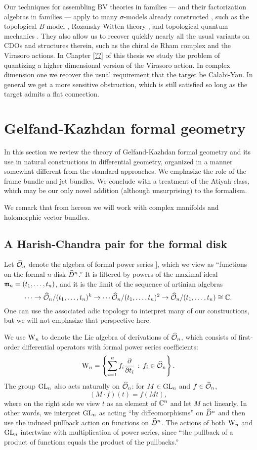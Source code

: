 \documentclass[10pt]{amsart}
\begin{document}
Our techniques for assembling BV theories in families --- and their factorization algebras in families --- apply to many $\sigma$-models already constructed , such as the topological $B$-model \cite{LiLi}, Rozansky-Witten theory \cite{CLL}, and topological quantum mechanics \cite{GG1, GLL}. 
They also allow us to recover quickly nearly all the usual variants on CDOs and structures therein, such as the chiral de Rham complex and the Virasoro actions.
In Chapter \ref{??} of this thesis we study the problem of quantizing a higher dimensional version of the Virasoro action. 
In complex dimension one we recover the usual requirement that the target be Calabi-Yau. 
In general we get a more sensitive obstruction, which is still satisfied so long as the target admits a flat connection.

\section{Gelfand-Kazhdan formal geometry}

In this section we review the theory of Gelfand-Kazhdan formal geometry and its use in natural constructions in differential geometry,
organized in a manner somewhat different from the standard
approaches. We emphasize the role of the frame bundle and jet bundles.
We conclude with a treatment of the Atiyah class, which may be our only novel addition (although unsurprising) to the formalism.

We remark that from hereon we will work with complex manifolds and holomorphic vector bundles.
 
\subsection{A Harish-Chandra pair for the formal disk}

Let $\widehat{\mathcal O}_n$ denote the algebra of formal power series 
\ben
\CC [[ t_1,\ldots,t_n ]],
\een 
which we view as ``functions on the formal $n$-disk $\widehat{D}^n$.'' 
It is filtered by powers of the maximal ideal ${\mathfrak m}_n = (t_1,\ldots,t_n)$, and it is the limit of the sequence of artinian algebras
\[
\cdots \to \widehat{\mathcal O}_n/(t_1,\ldots,t_n)^k \to \cdots \widehat{\mathcal O}_n/(t_1,\ldots,t_n)^2 \to \widehat{\mathcal O}_n/(t_1,\ldots,t_n) \cong \mathbb C.
\] 
One can use the associated adic topology to interpret many of our constructions, but we will not emphasize that perspective here.

We use ${{\rm W}_n}$ to denote the Lie algebra of derivations of $\widehat{\mathcal O}_n$, which consists of first-order differential operators with formal power series coefficients:
\[
{{\rm W}_n} = \left\{ \sum_{i =1 }^n f_i \frac{\partial}{\partial t_i} \,:\, f_i \in \widehat{\mathcal O}_n\right\}.
\]
The group ${\rm GL}_n$ also acts naturally on $\widehat{\mathcal O}_n$: for $M \in {\rm GL}_n$ and $f \in \widehat{\mathcal O}_n$,
\[
(M \cdot f)(t) = f (Mt),
\]
where on the right side we view $t$ as an element of $\mathbb C^n$ and let $M$ act linearly.
In other words, we interpret ${\rm GL}_n$ as acting ``by diffeomorphisms'' on $\widehat{D}^n$ and then use the induced pullback action on functions on $\widehat{D}^n$.
The actions of both ${{\rm W}_n}$ and ${\rm GL}_n$ intertwine with multiplication of power series, 
since ``the pullback of a product of functions equals the product of the pullbacks.''
\end{document}
